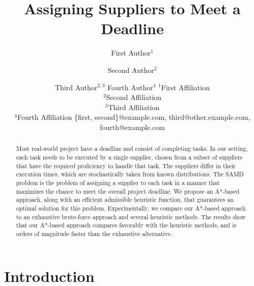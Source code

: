 \documentclass[letterpaper]{article}
\title{Assigning Suppliers to Meet a Deadline}
\author{
}
\author{
First Author$^1$
\and
Second Author$^2$\and
Third Author$^{2,3}$\And
Fourth Author$^4$
\affiliations
$^1$First Affiliation\\
$^2$Second Affiliation\\
$^3$Third Affiliation\\
$^4$Fourth Affiliation
\emails
\{first, second\}@example.com,
third@other.example.com,
fourth@example.com
}
\newcommand{\samd}{\ac{SAMD}\xspace}
\newcommand{\astar}{\textsc{A*}\xspace}
\begin{document}
\maketitle
\begin{abstract}
Most real-world project have a deadline and consist of completing tasks.
In our setting, each task needs to be executed by a single supplier, chosen from a subset of suppliers that have the required proficiency to handle that task. The suppliers differ in their execution times, which are stochastically taken from known distributions. The \samd problem is the problem of assigning a supplier to each task in a manner that maximizes the chance to meet the overall project deadline.
We propose an \astar-based approach, along with an efficient admissible heuristic function,   that guarantees an optimal solution for this problem. Experimentally, we compare our A*-based approach to an exhaustive brute-force approach and several heuristic methods. The results show that our A*-based approach compares favorably with the heuristic methods, and is orders of magnitude faster than the exhaustive alternative.
\end{abstract}

\section{Introduction}
\end{document}
